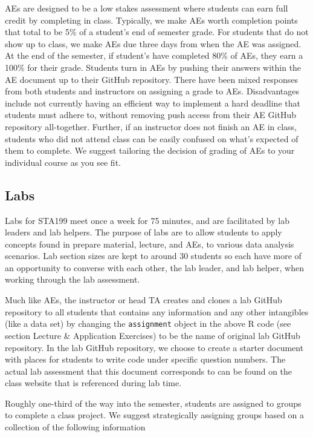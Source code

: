 \documentclass[
  12pt]{article}
\begin{document}
AEs are designed to be a low stakes assessment where students can earn
full credit by completing in class. Typically, we make AEs worth
completion points that total to be 5\% of a student's end of semester
grade. For students that do not show up to class, we make AEs due three
days from when the AE was assigned. At the end of the semester, if
student's have completed 80\% of AEs, they earn a 100\% for their grade.
Students turn in AEs by pushing their answers within the AE document up
to their GitHub repository. There have been mixed responses from both
students and instructors on assigning a grade to AEs. Disadvantages
include not currently having an efficient way to implement a hard
deadline that students must adhere to, without removing push access from
their AE GitHub repository all-together. Further, if an instructor does
not finish an AE in class, students who did not attend class can be
easily confused on what's expected of them to complete. We suggest
tailoring the decision of grading of AEs to your individual course as
you see fit.

\hypertarget{labs}{%
\subsection{Labs}\label{labs}}

Labs for STA199 meet once a week for 75 minutes, and are facilitated by
lab leaders and lab helpers. The purpose of labs are to allow students
to apply concepts found in prepare material, lecture, and AEs, to
various data analysis scenarios. Lab section sizes are kept to around 30
students so each have more of an opportunity to converse with each
other, the lab leader, and lab helper, when working through the lab
assessment.

Much like AEs, the instructor or head TA creates and clones a lab GitHub
repository to all students that contains any information and any other
intangibles (like a data set) by changing the \texttt{assignment} object
in the above R code (see section Lecture \& Application Exercises) to be
the name of original lab GitHub repository. In the lab GitHub
repository, we choose to create a starter document with places for
students to write code under specific question numbers. The actual lab
assessment that this document corresponds to can be found on the class
website that is referenced during lab time.

Roughly one-third of the way into the semester, students are assigned to
groups to complete a class project. We suggest strategically assigning
groups based on a collection of the following information
\end{document}
